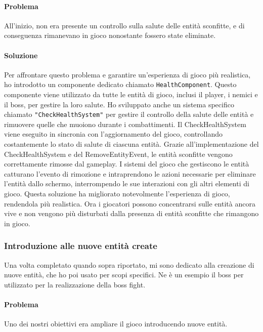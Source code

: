 \documentclass[a4paper,12pt]{report}
\begin{document}
\paragraph*{Problema}
All'inizio, non era presente un controllo sulla salute delle entità sconfitte, e di conseguenza rimanevano in gioco nonostante fossero state eliminate.
\paragraph*{Soluzione}
Per affrontare questo problema e garantire un'esperienza di gioco più realistica, ho introdotto un componente dedicato chiamato \texttt{HealthComponent}. 
Questo componente viene utilizzato da tutte le entità di gioco, inclusi il player, i nemici e il boss, per gestire la loro salute.
Ho sviluppato anche un sistema specifico chiamato \texttt{"CheckHealthSystem"} per gestire il controllo della salute delle entità e rimuovere quelle che muoiono durante i combattimenti. 
Il CheckHealthSystem viene eseguito in sincronia con l'aggiornamento del gioco, controllando costantemente lo stato di salute di ciascuna entità.
Grazie all'implementazione del CheckHealthSystem e del RemoveEntityEvent, le entità sconfitte vengono correttamente rimosse dal gameplay.
I sistemi del gioco che gestiscono le entità catturano l'evento di rimozione e intraprendono le azioni necessarie per eliminare l'entità dallo schermo, interrompendo le sue interazioni con gli altri elementi di gioco.
Questa soluzione ha migliorato notevolmente l'esperienza di gioco, rendendola più realistica. 
Ora i giocatori possono concentrarsi sulle entità ancora vive e non vengono più disturbati dalla presenza di entità sconfitte che rimangono in gioco.
\subsubsection*{Introduzione alle nuove entità create}
Una volta completato quando sopra riportato, mi sono dedicato alla creazione di nuove entità, che ho poi usato per scopi specifici.
Ne è un esempio il boss per utilizzato per la realizzazione della boss fight.
\paragraph*{Problema}
Uno dei nostri obiettivi era ampliare il gioco introducendo nuove entità.
\end{document}
